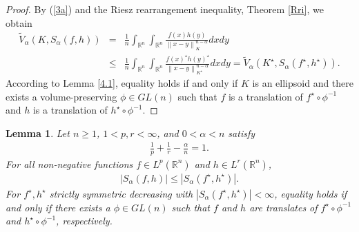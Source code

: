 \documentclass[preprint,12pt]{elsarticle}
\newtheorem{lem}{Lemma}
\begin{document}
\begin{proof}
By (\ref{3a}) and the Riesz rearrangement inequality, Theorem \ref{Rri}, we obtain
\begin{eqnarray*}
	\widetilde{V}_{\alpha} (K,{S}_{\alpha }(f,h))
	&=&\frac{1}{n}\int_{\mathbb{R}^n}\int_{\mathbb{R}^n}\frac{f(x)h(y)}{{\left \| x-y\right \|}_{K }^{n-\alpha}}dxdy\nonumber\\
	&\leq&  \frac{1}{n}\int_{\mathbb{R}^n}\int_{\mathbb{R}^n}\frac{f(x)^{\star }h(y)^{\star }}{{\left \| x-y\right \|}_{K ^{\star }}^{n-\alpha}}dxdy= \widetilde{V}_{\alpha} (K^{\star },{S}_{\alpha }(f^{\star },h^{\star })).
\end{eqnarray*}
According to Lemma \ref{4.1}, equality holds if and only if $K$ is an ellipsoid and there exists a volume-preserving $\phi\in GL(n)$ such that $f$ is a translation of $f^{\star} \circ \phi^{-1}$ and $h$ is a translation of $h^{\star} \circ \phi^{-1}$.
\end{proof}
\begin{lem}\label{l4.3} Let $n\ge 1$, $1<p,r<\infty $, and $0<\alpha <n$ satisfy
	\begin{eqnarray}
		\frac{1}{p}+\frac{1}{r}-\frac{\alpha }{n}=1.\nonumber   
	\end{eqnarray}
	For all non-negative functions $f\in L^{p}\left ( \mathbb{R}^n  \right ) $ and $h\in L^{r}\left ( \mathbb{R}^n  \right ) $,
	\begin{eqnarray*}
		\left | S_{\alpha }\left ( f,h \right )   \right |\le  \left | S_{\alpha }\left ( f^{\star } ,h^{\star }  \right )   \right |.
	\end{eqnarray*}
	For $f^{\star },h^{\star }$ strictly symmetric decreasing with $| {S}_{\alpha }(f^{\star },h^{\star })| < \infty $, equality holds if and only if there exists a $\phi\in GL(n)$ such that $f$ and $h$ are translates  of $f^{\star }\circ \phi ^{-1}$ and $h^{\star }\circ \phi ^{-1}$, respectively.
\end{lem}
\end{document}
